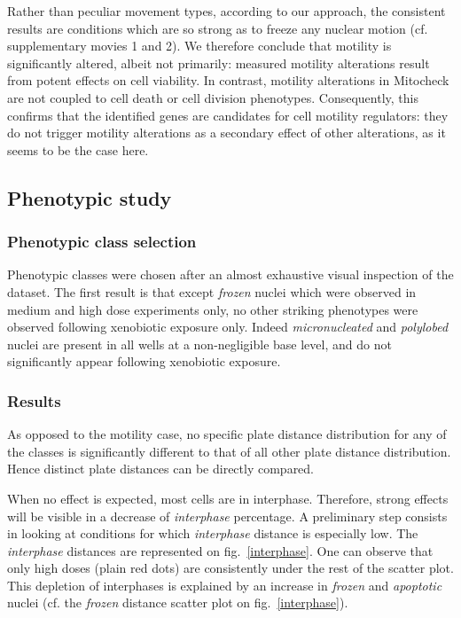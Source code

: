Rather than peculiar movement types, according to our approach, the
consistent results are conditions which are so strong as to freeze any
nuclear motion (cf. supplementary movies 1 and 2). We therefore
conclude that motility is significantly altered, albeit not primarily:
measured motility alterations result from potent effects on cell
viability. In contrast, motility alterations in Mitocheck are not coupled to cell
death or cell division phenotypes. Consequently, this confirms that
the identified genes are candidates for cell motility regulators: they do not
trigger motility alterations as a secondary effect of other
alterations, as it seems to be the case here. 

\subsection{Phenotypic study}
\subsubsection{Phenotypic class selection}
Phenotypic classes were chosen after an almost exhaustive visual
inspection of the dataset. The first result is that except
\textit{frozen} nuclei which were observed in medium and high dose
experiments only, no other striking phenotypes were observed following
xenobiotic exposure only. Indeed \textit{micronucleated} and
\textit{polylobed} nuclei are present in all wells at a non-negligible
base level, and do not significantly appear following xenobiotic
exposure. 

\subsubsection{Results}
As opposed to the motility case, no specific plate distance distribution for any of the classes is significantly different to that of all other plate distance distribution. Hence distinct plate distances can be directly compared. 

When no effect is expected, most cells are in interphase. Therefore, strong effects will be visible in a decrease of \textit{interphase} percentage. A preliminary step consists in looking at conditions for which \textit{interphase} distance is especially low. The \textit{interphase} distances are represented on fig.~\ref{interphase}. One can observe that only high doses (plain red dots) are consistently under the rest of the scatter plot. This depletion of interphases is explained by an increase in \textit{frozen} and \textit{apoptotic} nuclei (cf. the \textit{frozen} distance scatter plot on fig.~\ref{interphase}).

